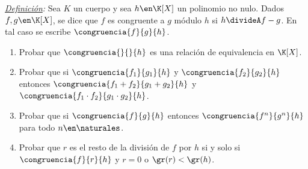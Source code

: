 \ejercicio

\textit{\underline {Definición}:} Sea $K$ un cuerpo y sea $h \en \K[X]$ un polinomio no nulo. Dados $f,g \en \K[X]$,
se dice que $f$ es congruente a $g$ módulo $h$ si $h \divideA f-g$. En tal caso se escribe $\congruencia{f}{g}{h}$.

\begin{enumerate}[label=\roman*)]
	\item Probar que $\congruencia{}{}{h}$ es una relación de equivalencia en $\K[X]$.

	\item Probar que si $\congruencia{f_1}{g_1}{h}$ y $\congruencia{f_2}{g_2}{h}$ entonces $\congruencia{f_1 + f_2}{g_1 + g_2}{h}$ y
	      $\congruencia{f_1 \cdot f_2}{ g_1 \cdot g_2}{h}$.

	\item Probar que si $\congruencia{f}{g}{h}$ entonces $\congruencia{f^n}{g^n}{h}$ para todo $n \en \naturales$.

	\item Probar que $r$ es el resto de la división de $f$ por $h$ si y solo si $\congruencia{f}{r}{h}$ y $r=0$ o $\gr(r) < \gr(h)$.
\end{enumerate}

\separadorCorto

